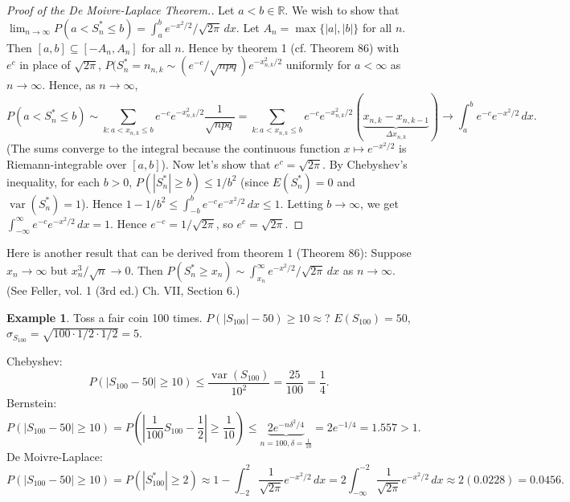 \documentclass{article}
\newcommand{\R}{\mathbb{R}}
\DeclareMathOperator{\var}{var}
\theoremstyle{definition}
\newtheorem*{example}{Example}
\begin{document}
\begin{proof}[Proof of the De Moivre-Laplace Theorem.]
    Let $a < b \in \R$. We wish to show that $\lim_{n \to \infty} P(a < S_n^* \leq b) = \int_a^b e^{-x^2/2}/\sqrt{2\pi} \,dx$. Let $A_n = \max\{|a|, |b|\}$ for all $n$. Then $[a, b] \subseteq [-A_n, A_n]$ for all $n$. Hence by theorem 1 (cf. Theorem 86) with $e^c$ in place of $\sqrt{2\pi}$, $P(S_n^* = n_{n,k} \sim (e^{-c}/\sqrt{npq})e^{-x_{n,k}^2/2}$ uniformly for $a < \infty$ as $n \to \infty$. Hence, as $n \to \infty$,
    \[
        P(a < S_n^* \leq b)
        \sim \sum_{k : a < x_{n,k} \leq b} e^{-c}e^{-x_{n,k}^2/2}\frac{1}{\sqrt{npq}}
        = \sum_{k : a < x_{n,k} \leq b} e^{-c}e^{-x_{n,k}^2/2}(\underbrace{x_{n,k} - x_{n, k-1}}_{\Delta x_{n,k}})
        \to \int_a^b e^{-c}e^{-x^2/2}\,dx.
    \]
    (The sums converge to the integral because the continuous function $x \mapsto e^{-x^2/2}$ is Riemann-integrable over $[a,b]$). Now let's show that $e^c = \sqrt{2\pi}$. By Chebyshev's inequality, for each $b > 0$, $P(|S_n^*| \geq b) \leq 1/b^2$ (since $E(S_n^*) = 0$ and $\var(S_n^*) = 1$). Hence $1 - 1/b^2 \leq \int_{-b}^b e^{-c} e^{-x^2/2}\,dx \leq 1$. Letting $b \to \infty$, we get $\int_{-\infty}^\infty e^{-c} e^{-x^2/2} \,dx = 1$. Hence $e^{-c} = 1/\sqrt{2\pi}$, so $e^c = \sqrt{2\pi}$.
\end{proof}

Here is another result that can be derived from theorem 1 (Theorem 86): Suppose $x_n \to \infty$ but $x_n^3 / \sqrt{n} \to 0$. Then $P(S_n^* \geq x_n) \sim \int_{x_n}^\infty e^{-x^2/2}/\sqrt{2\pi} \,dx$ as $n \to \infty$. (See Feller, vol. 1 (3rd ed.) Ch. VII, Section 6.)

\begin{example}
Toss a fair coin 100 times. $P(|S_{100}| - 50) \geq 10 \approx$?
$E(S_{100}) = 50$, $\sigma_{S_{100}} = \sqrt{100 \cdot 1/2 \cdot 1/2} = 5$.

Chebyshev:
\[
    P(|S_{100} - 50| \geq 10) \leq \frac{\var(S_{100})}{10^2} = \frac{25}{100} = \frac{1}{4}.
\]
Bernstein:
\[
    P(|S_{100} - 50| \geq 10) = P\left(\left|\frac{1}{100}S_{100} - \frac{1}{2}\right| \geq \frac{1}{10} \right) \leq \underbrace{2e^{-n\delta^2/4}}_{n = 100, \delta = \frac{1}{10}} = 2e^{-1/4} = 1.557 > 1.
\]
De Moivre-Laplace:
\[
    P(|S_{100} - 50| \geq 10) = P(|S_{100}^*| \geq 2) \approx 1 - \int_{-2}^2 \frac{1}{\sqrt{2\pi}}e^{-x^2/2}\,dx = 2\int_{-\infty}^{-2} \frac{1}{\sqrt{2\pi}}e^{-x^2/2} \,dx \approx 2(0.0228) = 0.0456.
\]
\end{example}
\end{document}
